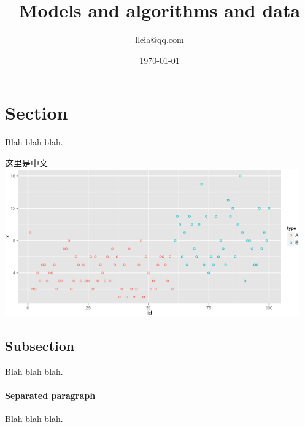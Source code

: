 \documentclass[12pt]{article}
\begin{document}
\title{\textsf{Models and algorithms and data}}
\author{\textsf{lleia@qq.com}}
\date{\today}
\maketitle

\section{Section}

Blah blah blah.

这里是中文
\includegraphics[width=5in]{chmd.eps}

\subsection{Subsection}

Blah blah blah.

\paragraph{Separated paragraph} Blah blah blah.



\end{document}
